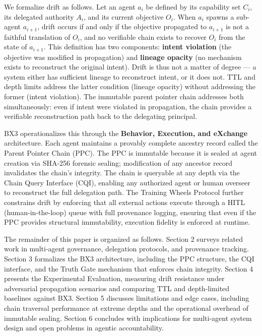 We formalize drift as follows. Let an agent $a_i$ be defined by its capability set $C_i$, its delegated authority $A_i$, and its current objective $O_i$. When $a_i$ spawns a sub-agent $a_{i+1}$, drift occurs if and only if the objective propagated to $a_{i+1}$ is not a faithful translation of $O_i$, and no verifiable chain exists to recover $O_i$ from the state of $a_{i+1}$. This definition has two components: \textbf{intent violation} (the objective was modified in propagation) and \textbf{lineage opacity} (no mechanism exists to reconstruct the original intent). Drift is thus not a matter of degree --- a system either has sufficient lineage to reconstruct intent, or it does not. TTL and depth limits address the latter condition (lineage opacity) without addressing the former (intent violation). The immutable parent pointer chain addresses both simultaneously: even if intent were violated in propagation, the chain provides a verifiable reconstruction path back to the delegating principal.

BX3 operationalizes this through the \textbf{Behavior, Execution, and eXchange} architecture. Each agent maintains a provably complete ancestry record called the Parent Pointer Chain (PPC). The PPC is immutable because it is sealed at agent creation via SHA-256 forensic sealing; modification of any ancestor record invalidates the chain's integrity. The chain is queryable at any depth via the Chain Query Interface (CQI), enabling any authorized agent or human overseer to reconstruct the full delegation path. The Training Wheels Protocol further constrains drift by enforcing that all external actions execute through a HITL (human-in-the-loop) queue with full provenance logging, ensuring that even if the PPC provides structural immutability, execution fidelity is enforced at runtime.

The remainder of this paper is organized as follows. Section 2 surveys related work in multi-agent governance, delegation protocols, and provenance tracking. Section 3 formalizes the BX3 architecture, including the PPC structure, the CQI interface, and the Truth Gate mechanism that enforces chain integrity. Section 4 presents the Experimental Evaluation, measuring drift resistance under adversarial propagation scenarios and comparing TTL and depth-limited baselines against BX3. Section 5 discusses limitations and edge cases, including chain traversal performance at extreme depths and the operational overhead of immutable sealing. Section 6 concludes with implications for multi-agent system design and open problems in agentic accountability.